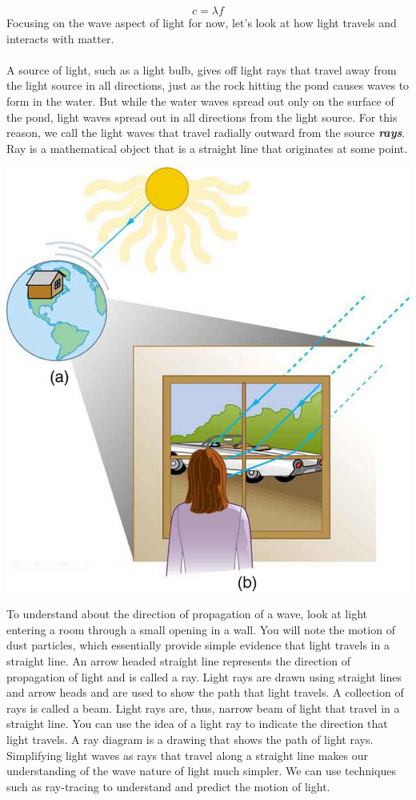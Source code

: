 \documentclass[11pt]{article}
\begin{document}
	$$c=\lambda f$$
	Focusing on the wave aspect of light for now, let's look at how light travels and interacts with matter. \\ \\
	A source of light, such as a light bulb, gives off light rays that travel away from the light source in all directions, just as the rock hitting the pond causes waves to form in the water. But while the water waves spread out only on the surface of the pond, light waves spread out in all directions from the light source. For this reason, we call the light waves that travel radially outward from the source \textit{\textbf{rays}}. Ray is a mathematical object that is a straight line that originates at some point.
	\begin{center}
		\includegraphics[scale=0.5]{source}
	\end{center}
	To understand about the direction of propagation of a wave, look at light entering a room through a small opening in a wall. You will note the motion of dust particles, which essentially provide simple evidence that light travels in a straight line. An arrow headed straight line represents the direction of propagation of light and is called a ray. Light rays are drawn using straight lines and arrow heads and are used to show the path that light travels. A collection of rays is called a beam. Light rays are, thus, narrow beam of light that travel in a straight line. You can use the idea of a light ray to indicate the direction that light travels. A ray diagram is a drawing that shows the path of light rays. Simplifying light waves as rays that travel along a straight line makes our understanding of the wave nature of light much simpler. We can use techniques such as ray-tracing to understand and predict the motion of light.   
\end{document}
